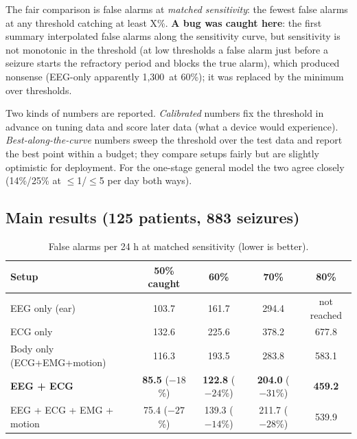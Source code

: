 The fair comparison is false alarms at \emph{matched sensitivity}: the fewest false alarms at any threshold catching at least X\%. \textbf{A bug was caught here}: the first summary interpolated false alarms along the sensitivity curve, but sensitivity is not monotonic in the threshold (at low thresholds a false alarm just before a seizure starts the refractory period and blocks the true alarm), which produced nonsense (EEG-only apparently 1,300\,\FAd{} at 60\%); it was replaced by the minimum over thresholds.

Two kinds of numbers are reported. \emph{Calibrated} numbers fix the threshold in advance on tuning data and score later data (what a device would experience). \emph{Best-along-the-curve} numbers sweep the threshold over the test data and report the best point within a budget; they compare setups fairly but are slightly optimistic for deployment. For the one-stage general model the two agree closely (14\%/25\% at $\le$1/$\le$5 per day both ways).

\subsection{Main results (125 patients, 883 seizures)}

\begin{table}[H]
\centering\small
\caption{False alarms per 24 h at matched sensitivity (lower is better).}
\label{tab:sz2main}
\begin{tabular}{@{}lcccc@{}}
\toprule
Setup & 50\% caught & 60\% & 70\% & 80\% \\
\midrule
EEG only (ear) & 103.7 & 161.7 & 294.4 & not reached \\
ECG only & 132.6 & 225.6 & 378.2 & 677.8 \\
Body only (ECG+EMG+motion) & 116.3 & 193.5 & 283.8 & 583.1 \\
\textbf{EEG + ECG} & \textbf{85.5} ($-18$\%) & \textbf{122.8} ($-24$\%) & \textbf{204.0} ($-31$\%) & \textbf{459.2} \\
EEG + ECG + EMG + motion & 75.4 ($-27$\%) & 139.3 ($-14$\%) & 211.7 ($-28$\%) & 539.9 \\
\bottomrule
\end{tabular}
\end{table}

